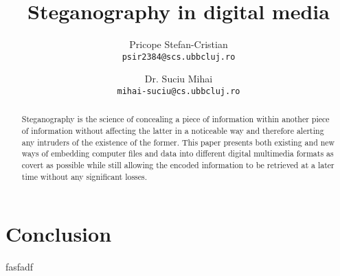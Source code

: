 \documentclass[notitlepage]{report}
\begin{document}
\pretitle{\begin{center}\Huge\bfseries\vspace*{5em}}
\posttitle{\par\end{center}\vskip 0.5em}
\postdate{\end{center}\vspace*{7em}}

\title{Steganography in digital media}

\author{
	Pricope Stefan-Cristian\\
	\texttt{psir2384@scs.ubbcluj.ro}
  	\and
  	Dr. Suciu Mihai\\
  	\texttt{mihai-suciu@cs.ubbcluj.ro}
}
\date{\vspace{-6ex}}
\maketitle
\thispagestyle{empty}

\begin{abstract}
Steganography is the science of concealing a piece of information within another piece of information without affecting the latter in a noticeable way and therefore alerting any intruders of the existence of the former. 
This paper presents both existing and new ways of embedding computer files and data into different digital multimedia formats as covert as possible while still allowing the encoded information to be retrieved at a later time without any significant losses.
\end{abstract}


\tableofcontents{}







\chapter{Conclusion}
fasfadf



  

\end{document}
